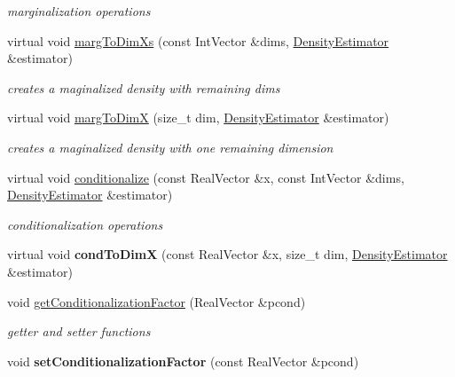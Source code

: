 \begin{DoxyCompactItemize}
\begin{DoxyCompactList}\small\item\em marginalization operations \end{DoxyCompactList}\item 
virtual void \hyperlink{classPecos_1_1GaussianKDE_a50f735eabae41f8948d792ac84749095}{marg\+To\+Dim\+Xs} (const Int\+Vector \&dims, \hyperlink{classPecos_1_1DensityEstimator}{Density\+Estimator} \&estimator)\label{classPecos_1_1GaussianKDE_a50f735eabae41f8948d792ac84749095}

\begin{DoxyCompactList}\small\item\em creates a maginalized density with remaining dims \end{DoxyCompactList}\item 
virtual void \hyperlink{classPecos_1_1GaussianKDE_ab1e735a6e2e62abfaa78e44d3a6bd9ec}{marg\+To\+DimX} (size\+\_\+t dim, \hyperlink{classPecos_1_1DensityEstimator}{Density\+Estimator} \&estimator)\label{classPecos_1_1GaussianKDE_ab1e735a6e2e62abfaa78e44d3a6bd9ec}

\begin{DoxyCompactList}\small\item\em creates a maginalized density with one remaining dimension \end{DoxyCompactList}\item 
virtual void \hyperlink{classPecos_1_1GaussianKDE_a48a43dfe8975d003c2c7cff695046414}{conditionalize} (const Real\+Vector \&x, const Int\+Vector \&dims, \hyperlink{classPecos_1_1DensityEstimator}{Density\+Estimator} \&estimator)\label{classPecos_1_1GaussianKDE_a48a43dfe8975d003c2c7cff695046414}

\begin{DoxyCompactList}\small\item\em conditionalization operations \end{DoxyCompactList}\item 
virtual void {\bfseries cond\+To\+DimX} (const Real\+Vector \&x, size\+\_\+t dim, \hyperlink{classPecos_1_1DensityEstimator}{Density\+Estimator} \&estimator)\label{classPecos_1_1GaussianKDE_aa4b4c620def1d4611d3e10dcd4b3a073}

\item 
void \hyperlink{classPecos_1_1GaussianKDE_a795359a100b6b2113637ae2d0c6cd148}{get\+Conditionalization\+Factor} (Real\+Vector \&pcond)\label{classPecos_1_1GaussianKDE_a795359a100b6b2113637ae2d0c6cd148}

\begin{DoxyCompactList}\small\item\em getter and setter functions \end{DoxyCompactList}\item 
void {\bfseries set\+Conditionalization\+Factor} (const Real\+Vector \&pcond)\label{classPecos_1_1GaussianKDE_a680bc5e5333d94f3c342d99c501a43eb}


\end{DoxyCompactItemize}
